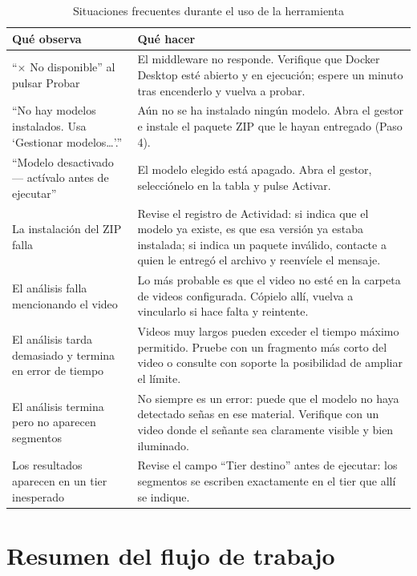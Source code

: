 \documentclass[12pt,a4paper]{article}
\begin{document}
\begin{table}[H]
\centering
\caption{Situaciones frecuentes durante el uso de la herramienta}
\footnotesize
\begin{tabular}{
    >{\raggedright\arraybackslash}p{4.8cm}
    >{\raggedright\arraybackslash}p{9.6cm}
}
\toprule
\textbf{Qué observa} & \textbf{Qué hacer} \\
\midrule
``$\times$ No disponible'' al pulsar Probar & El middleware no responde. Verifique que Docker Desktop esté abierto y en ejecución; espere un minuto tras encenderlo y vuelva a probar. \\
``No hay modelos instalados. Usa `Gestionar modelos\ldots'.'' & Aún no se ha instalado ningún modelo. Abra el gestor e instale el paquete ZIP que le hayan entregado (Paso 4). \\
``Modelo desactivado --- actívalo antes de ejecutar'' & El modelo elegido está apagado. Abra el gestor, selecciónelo en la tabla y pulse Activar. \\
La instalación del ZIP falla & Revise el registro de Actividad: si indica que el modelo ya existe, es que esa versión ya estaba instalada; si indica un paquete inválido, contacte a quien le entregó el archivo y reenvíele el mensaje. \\
El análisis falla mencionando el video & Lo más probable es que el video no esté en la carpeta de videos configurada. Cópielo allí, vuelva a vincularlo si hace falta y reintente. \\
El análisis tarda demasiado y termina en error de tiempo & Videos muy largos pueden exceder el tiempo máximo permitido. Pruebe con un fragmento más corto del video o consulte con soporte la posibilidad de ampliar el límite. \\
El análisis termina pero no aparecen segmentos & No siempre es un error: puede que el modelo no haya detectado señas en ese material. Verifique con un video donde el señante sea claramente visible y bien iluminado. \\
Los resultados aparecen en un tier inesperado & Revise el campo ``Tier destino'' antes de ejecutar: los segmentos se escriben exactamente en el tier que allí se indique. \\
\bottomrule
\end{tabular}
\end{table}

\section{Resumen del flujo de trabajo}
\end{document}
